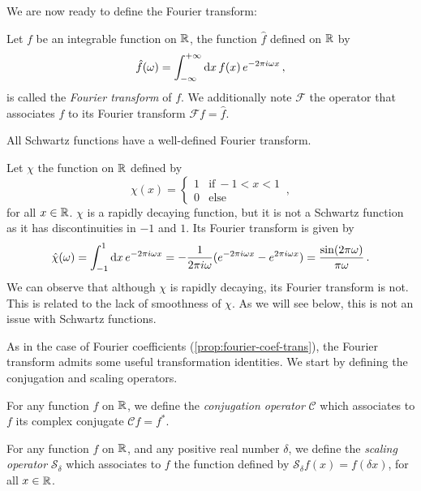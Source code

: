 We are now ready to define the Fourier transform:
\begin{definition}
  Let $f$ be an integrable function on $\mathbb{R}$, the function $\hat{f}$ defined on $\mathbb{R}$ by
  \begin{equation}
    \hat{f}(\omega)=\int_{-\infty}^{+\infty}\mathrm{d} x\,f(x)\,e^{-2\pi i\omega x}\,,
  \end{equation}
  is called the \emph{Fourier transform} of $f$. We additionally note $\mathcal{F}$ the
  operator that associates $f$ to its Fourier transform $\mathcal{F}f=\hat{f}$.
\end{definition}
\begin{proposition}
  All Schwartz functions have a well-defined Fourier transform.
\end{proposition}
\begin{example}
  Let $\chi$ the function on $\mathbb{R}$ defined by
  \begin{equation}
    \chi(x)=
    \begin{cases}
      1&\text{if}~-1<x<1\\
      0&\text{else}
    \end{cases}\,,
  \end{equation}
  for all $x\in\mathbb{R}$. $\chi$ is a rapidly decaying function, but it is not a Schwartz
  function as it has discontinuities in $-1$ and $1$. Its Fourier transform is given by
  \begin{equation}
    \hat{\chi}(\omega)=\int_{-1}^1\mathrm{d} x\,e^{-2\pi i\omega x}=
    -\frac{1}{2\pi i\omega}(e^{-2\pi i\omega x}-e^{2\pi i\omega x})=\frac{\sin(2\pi\omega)}{\pi\omega}\,.
  \end{equation}
  We can observe that although $\chi$ is rapidly decaying, its Fourier transform is not.
  This is related to the lack of smoothness of $\chi$. As we will see below, this is not
  an issue with Schwartz functions.
\end{example}
As in the case of Fourier coefficients (\cref{prop:fourier-coef-trans}), the Fourier
transform admits some useful transformation identities. We start by defining the
conjugation and scaling operators.
\begin{definition}
  For any function $f$ on $\mathbb{R}$, we define the \emph{conjugation operator} $\mathcal{C}$
  which associates to $f$ its complex conjugate $\mathcal{C}f=f^*$.
\end{definition}
\begin{definition}
  For any function $f$ on $\mathbb{R}$, and any positive real number $\delta$, we define the
  \emph{scaling operator} $\mathcal{S}_{\delta}$ which associates to $f$ the function
  defined by $\mathcal{S}_{\delta}f(x)=f(\delta x)$, for all $x\in\mathbb{R}$.
\end{definition}
